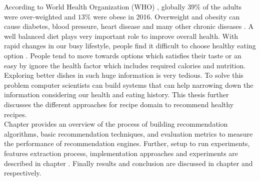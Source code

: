 According to World Health Organization (WHO) \cite{42}, globally $39\%$ of the adults were over-weighted and $13\%$ were obese in 2016. Overweight and obesity can cause diabetes, blood pressure, heart disease and many other chronic diseases \cite{43}. A well balanced diet plays very important role to improve overall health. With rapid changes in our busy lifestyle, people find it difficult to choose healthy eating option \cite{13}. People tend to move towards options which satisfies their taste or an easy by ignore the health factor which includes required calories and nutrition. Exploring better dishes in such huge information is very tedious. To solve this problem computer scientists can build systems that can help narrowing down the information considering our health and eating history. This thesis further discusses the different approaches for recipe domain to recommend healthy recipes.
\\
Chapter  provides an overview of the process of building recommendation algorithms, basic recommendation techniques, and evaluation metrics to measure the performance of recommendation engines. Further, setup to run experiments, features extraction process, implementation approaches and experiments are described in chapter . Finally results and conclusion are discussed in chapter  and  respectively.
\pagebreak


